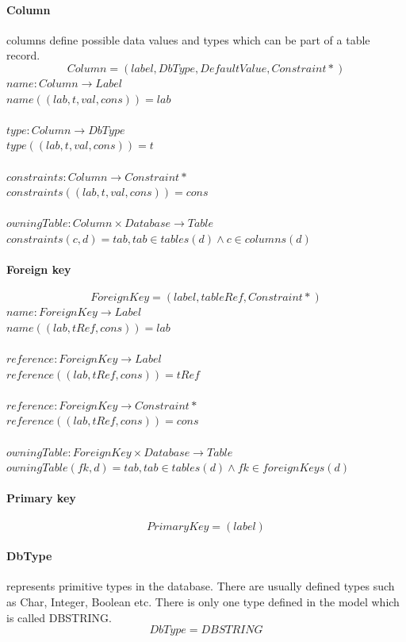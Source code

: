 \documentclass[11pt]{article}
\begin{document}
\paragraph{Column} columns define possible data values and types which can be part of a table record.
$$
Column = (label, DbType, DefaultValue, Constraint*)
$$
$name : Column \rightarrow Label $ \\
$name((lab, t, val, cons)) = lab $ \\ \\
$type : Column \rightarrow DbType $ \\
$type((lab, t, val, cons)) = t $ \\ \\
$constraints : Column \rightarrow Constraint* $ \\
$constraints((lab, t, val, cons)) = cons $ \\ \\
$owningTable : Column \times Database \rightarrow Table $ \\
$constraints(c, d) = tab, tab \in tables(d) \wedge c \in columns(d) $

\paragraph{Foreign key}
$$
ForeignKey = (label, tableRef, Constraint*)
$$
$name : ForeignKey \rightarrow Label $ \\
$name((lab, tRef, cons)) = lab $ \\ \\
$reference : ForeignKey \rightarrow Label $ \\
$reference((lab, tRef, cons)) = tRef $ \\ \\
$reference : ForeignKey \rightarrow Constraint* $ \\
$reference((lab, tRef, cons)) = cons $ \\ \\
$owningTable : ForeignKey \times Database \rightarrow Table $ \\
$owningTable(fk, d) = tab, tab \in tables(d) \wedge fk \in foreignKeys(d) $

\paragraph{Primary key}
$$
PrimaryKey =  (label) 	
$$

\paragraph{DbType} represents primitive types in the database. There are usually defined types such as Char, Integer, Boolean etc. There is only one type defined in the model which is called DBSTRING.
$$
DbType = DBSTRING
$$
\end{document}

